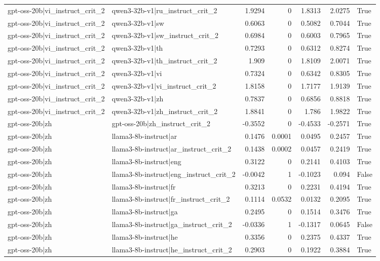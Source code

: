 \begin{table}
\begin{tabular}{l l r r r r l}
gpt-oss-20b|vi_instruct_crit_2 & qwen3-32b-v1|ru_instruct_crit_2 & 1.9294 & 0 & 1.8313 & 2.0275 & True \\
gpt-oss-20b|vi_instruct_crit_2 & qwen3-32b-v1|sw & 0.6063 & 0 & 0.5082 & 0.7044 & True \\
gpt-oss-20b|vi_instruct_crit_2 & qwen3-32b-v1|sw_instruct_crit_2 & 0.6984 & 0 & 0.6003 & 0.7965 & True \\
gpt-oss-20b|vi_instruct_crit_2 & qwen3-32b-v1|th & 0.7293 & 0 & 0.6312 & 0.8274 & True \\
gpt-oss-20b|vi_instruct_crit_2 & qwen3-32b-v1|th_instruct_crit_2 & 1.909 & 0 & 1.8109 & 2.0071 & True \\
gpt-oss-20b|vi_instruct_crit_2 & qwen3-32b-v1|vi & 0.7324 & 0 & 0.6342 & 0.8305 & True \\
gpt-oss-20b|vi_instruct_crit_2 & qwen3-32b-v1|vi_instruct_crit_2 & 1.8158 & 0 & 1.7177 & 1.9139 & True \\
gpt-oss-20b|vi_instruct_crit_2 & qwen3-32b-v1|zh & 0.7837 & 0 & 0.6856 & 0.8818 & True \\
gpt-oss-20b|vi_instruct_crit_2 & qwen3-32b-v1|zh_instruct_crit_2 & 1.8841 & 0 & 1.786 & 1.9822 & True \\
gpt-oss-20b|zh & gpt-oss-20b|zh_instruct_crit_2 & -0.3552 & 0 & -0.4533 & -0.2571 & True \\
gpt-oss-20b|zh & llama3-8b-instruct|ar & 0.1476 & 0.0001 & 0.0495 & 0.2457 & True \\
gpt-oss-20b|zh & llama3-8b-instruct|ar_instruct_crit_2 & 0.1438 & 0.0002 & 0.0457 & 0.2419 & True \\
gpt-oss-20b|zh & llama3-8b-instruct|eng & 0.3122 & 0 & 0.2141 & 0.4103 & True \\
gpt-oss-20b|zh & llama3-8b-instruct|eng_instruct_crit_2 & -0.0042 & 1 & -0.1023 & 0.094 & False \\
gpt-oss-20b|zh & llama3-8b-instruct|fr & 0.3213 & 0 & 0.2231 & 0.4194 & True \\
gpt-oss-20b|zh & llama3-8b-instruct|fr_instruct_crit_2 & 0.1114 & 0.0532 & 0.0132 & 0.2095 & True \\
gpt-oss-20b|zh & llama3-8b-instruct|ga & 0.2495 & 0 & 0.1514 & 0.3476 & True \\
gpt-oss-20b|zh & llama3-8b-instruct|ga_instruct_crit_2 & -0.0336 & 1 & -0.1317 & 0.0645 & False \\
gpt-oss-20b|zh & llama3-8b-instruct|he & 0.3356 & 0 & 0.2375 & 0.4337 & True \\
gpt-oss-20b|zh & llama3-8b-instruct|he_instruct_crit_2 & 0.2903 & 0 & 0.1922 & 0.3884 & True \\

\end{tabular}
\end{table}
